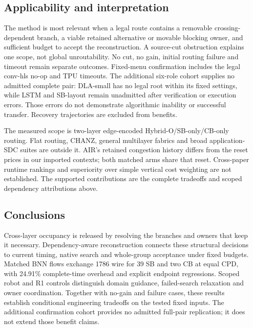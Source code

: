 \documentclass[conference,10pt]{IEEEtran}
\begin{document}
\subsection{Applicability and interpretation}
The method is most relevant when a legal route contains a removable crossing-dependent branch, a viable retained alternative or movable blocking owner, and sufficient budget to accept the reconstruction. A source-cut obstruction explains one scope, not global unroutability. No cut, no gain, initial routing failure and timeout remain separate outcomes. Fixed-menu confirmation includes the legal conv-hls no-op and TPU timeouts. The additional six-role cohort supplies no admitted complete pair: DLA-small has no legal root within its fixed settings, while LSTM and SB-layout remain unadmitted after verification or execution errors. Those errors do not demonstrate algorithmic inability or successful transfer. Recovery trajectories are excluded from benefits.

The measured scope is two-layer edge-encoded Hybrid-O/SB-only/CB-only routing. Flat routing, CHANZ, general multilayer fabrics and broad application-SDC suites are outside it. AIR's retained congestion history differs from the reset prices in our imported contexts; both matched arms share that reset. Cross-paper runtime rankings and superiority over simple vertical cost weighting are not established. The supported contributions are the complete tradeoffs and scoped dependency attributions above.

\subsection{Conclusions}
Cross-layer occupancy is released by resolving the branches and owners that keep it necessary. Dependency-aware reconstruction connects these structural decisions to current timing, native search and whole-group acceptance under fixed budgets. Matched BNN flows exchange 1786 wire for 39 SB and two CB at equal CPD, with 24.91\% complete-time overhead and explicit endpoint regressions. Scoped robot and R1 controls distinguish domain guidance, failed-search relaxation and owner coordination. Together with no-gain and failure cases, these results establish conditional engineering tradeoffs on the tested fixed inputs. The additional confirmation cohort provides no admitted full-pair replication; it does not extend those benefit claims.


\end{document}
